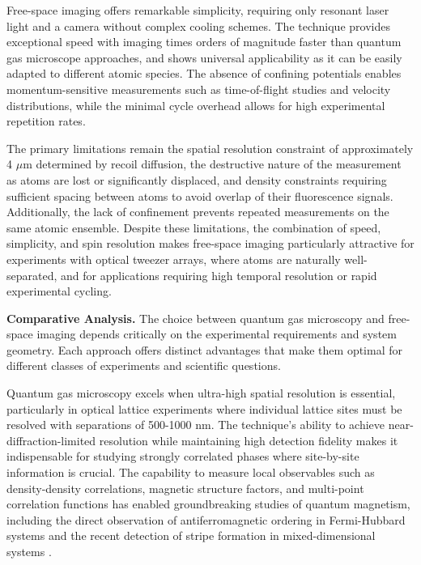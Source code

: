 Free-space imaging offers remarkable simplicity, requiring only resonant laser light and a camera without complex cooling schemes. The technique provides exceptional speed with imaging times orders of magnitude faster than quantum gas microscope approaches, and shows universal applicability as it can be easily adapted to different atomic species. The absence of confining potentials enables momentum-sensitive measurements such as time-of-flight studies and velocity distributions, while the minimal cycle overhead allows for high experimental repetition rates.

The primary limitations remain the spatial resolution constraint of approximately 4 $\mu$m determined by recoil diffusion, the destructive nature of the measurement as atoms are lost or significantly displaced, and density constraints requiring sufficient spacing between atoms to avoid overlap of their fluorescence signals. Additionally, the lack of confinement prevents repeated measurements on the same atomic ensemble. Despite these limitations, the combination of speed, simplicity, and spin resolution makes free-space imaging particularly attractive for experiments with optical tweezer arrays, where atoms are naturally well-separated, and for applications requiring high temporal resolution or rapid experimental cycling.

\textbf{Comparative Analysis.} The choice between quantum gas microscopy and free-space imaging depends critically on the experimental requirements and system geometry. Each approach offers distinct advantages that make them optimal for different classes of experiments and scientific questions.

Quantum gas microscopy excels when ultra-high spatial resolution is essential, particularly in optical lattice experiments where individual lattice sites must be resolved with separations of 500-1000 nm. The technique's ability to achieve near-diffraction-limited resolution while maintaining high detection fidelity makes it indispensable for studying strongly correlated phases where site-by-site information is crucial. The capability to measure local observables such as density-density correlations, magnetic structure factors, and multi-point correlation functions has enabled groundbreaking studies of quantum magnetism, including the direct observation of antiferromagnetic ordering in Fermi-Hubbard systems \cite{boll_spin-_2016, parsons_site-resolved_2016} and the recent detection of stripe formation in mixed-dimensional systems \cite{bourgund_formation_2025}.

